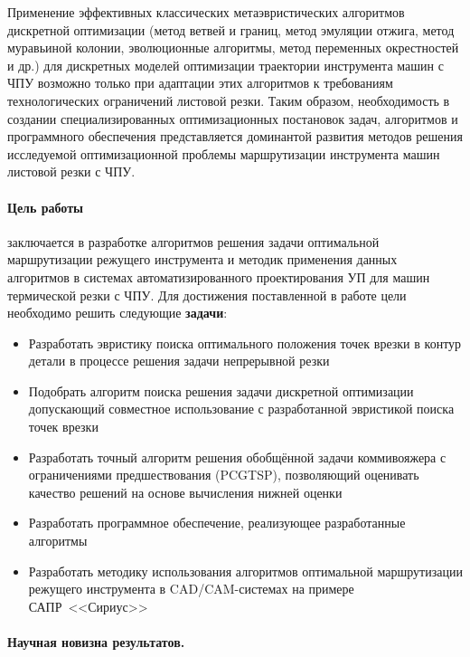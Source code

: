 Применение эффективных классических метаэвристических алгоритмов дискретной оптимизации 
(метод ветвей и границ, метод эмуляции отжига, метод муравьиной колонии, эволюционные алгоритмы, метод переменных окрестностей и др.) 
для дискретных моделей оптимизации траектории инструмента машин с ЧПУ 
возможно только при адаптации этих алгоритмов к требованиям технологических ограничений листовой резки.
Таким образом, 
необходимость в создании специализированных оптимизационных постановок задач, 
алгоритмов и программного обеспечения представляется 
доминантой развития методов решения исследуемой оптимизационной проблемы 
маршрутизации инструмента машин листовой резки с ЧПУ.

\paragraph*{Цель работы}
заключается в разработке алгоритмов решения задачи оптимальной
маршрутизации режущего инструмента 
и методик применения данных алгоритмов
в системах автоматизированного проектирования УП для машин термической резки с ЧПУ.
Для достижения поставленной в работе цели необходимо решить следующие 
{\bf задачи}:

\begin{itemize}
    \item 
    Разработать эвристику поиска оптимального положения
    точек врезки в контур детали в процессе решения задачи
    непрерывной резки
    \item 
    Подобрать алгоритм поиска решения задачи дискретной оптимизации
    допускающий совместное использование
    с разработанной эвристикой поиска точек врезки
    \item
    Разработать точный алгоритм решения 
    обобщённой задачи коммивояжера
    с ограничениями предшествования (PCGTSP),
    позволяющий оценивать качество решений
    на основе вычисления нижней оценки
    \item 
    Разработать программное обеспечение,
    реализующее разработанные алгоритмы
    \item 
    Разработать методику использования алгоритмов 
    оптимальной маршрутизации режущего инструмента
    в CAD/CAM-системах на примере САПР~<<Сириус>>
\end{itemize}

\paragraph*{Научная новизна результатов.}

